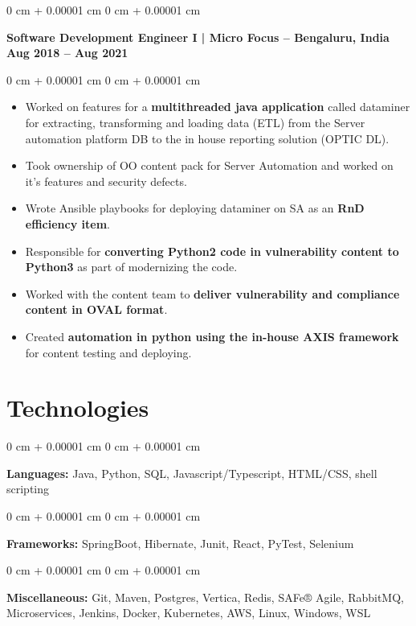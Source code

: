 \documentclass[10pt, letterpaper]{article}
\newenvironment{highlights}{
    \begin{itemize}[
        topsep=0.10 cm,
        parsep=0.10 cm,
        partopsep=0pt,
        itemsep=0pt,
        leftmargin=0 cm + 10pt
    ]
}{
    \end{itemize}
} %
\newenvironment{onecolentry}{
    \begin{adjustwidth}{
        0 cm + 0.00001 cm
    }{
        0 cm + 0.00001 cm
    }
}{
    \end{adjustwidth}
} %
\newenvironment{twocolentry}[2][]{
    \onecolentry
    \def\secondColumn{#2}
    \setcolumnwidth{\fill, 4.5 cm}
    \begin{paracol}{2}
}{
    \switchcolumn \raggedleft \secondColumn
    \end{paracol}
    \endonecolentry
} %
\begin{document}
        \vspace{0.5 cm}

        \begin{twocolentry}{
            \textbf{Aug 2018 – Aug 2021}
        }
            {\textbf{{\color{MidnightBlue}Software Development Engineer I} |  Micro Focus -- Bengaluru, India}}\end{twocolentry}
        \vspace{0.10 cm}

        \vspace{0.10 cm}
         \begin{onecolentry}
            \begin{highlights}
                \item Worked on features for a \textbf{multithreaded java application} called dataminer for extracting, transforming and loading data (ETL) from the Server automation platform DB to the in house reporting solution (OPTIC DL).
                \item Took ownership of OO content pack for Server Automation and worked on it's features and security defects.
                \item Wrote Ansible playbooks for deploying dataminer on SA as an \textbf{RnD efficiency item}.
                \item Responsible for \textbf{converting Python2 code in vulnerability content to Python3} as part of modernizing the code.
                \item Worked with the content team to \textbf{deliver vulnerability and compliance content in OVAL format}.
                \item Created \textbf{automation in python using the in-house AXIS framework} for content testing and deploying.
            \end{highlights}
        \end{onecolentry}

    \section{Technologies}    
        \begin{onecolentry}
            \textbf{Languages:} Java, Python, SQL, Javascript/Typescript, HTML/CSS, shell scripting
        \end{onecolentry}
        \begin{onecolentry}
            \textbf{Frameworks:} SpringBoot, Hibernate, Junit, React, PyTest, Selenium
        \end{onecolentry}
        \begin{onecolentry}
            \textbf{Miscellaneous:} Git, Maven, Postgres, Vertica, Redis, SAFe® Agile, RabbitMQ, Microservices, Jenkins, Docker, Kubernetes, AWS, Linux, Windows, WSL
        \end{onecolentry}
\end{document}

